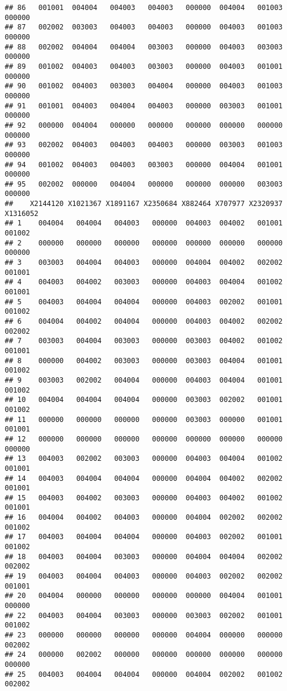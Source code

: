 \documentclass[
]{article}
\begin{document}
\begin{verbatim}
## 86   001001  004004   004003   004003   000000  004004   001003   000000
## 87   002002  003003   004003   004003   000000  004003   001003   000000
## 88   002002  004004   004004   003003   000000  004003   003003   000000
## 89   001002  004003   004003   003003   000000  004003   001001   000000
## 90   001002  004003   003003   004004   000000  004003   001003   000000
## 91   001001  004003   004004   004003   000000  003003   001001   000000
## 92   000000  004004   000000   000000   000000  000000   000000   000000
## 93   002002  004003   004003   004003   000000  003003   001003   000000
## 94   001002  004003   004003   003003   000000  004004   001001   000000
## 95   002002  000000   004004   000000   000000  000000   003003   000000
##    X2144120 X1021367 X1891167 X2350684 X882464 X707977 X2320937 X1316052
## 1    004004   004004   004003   000000  004003  004002   001001   001002
## 2    000000   000000   000000   000000  000000  000000   000000   000000
## 3    003003   004004   004003   000000  004004  004002   002002   001001
## 4    004003   004002   003003   000000  004003  004004   001002   001001
## 5    004003   004004   004004   000000  004003  002002   001001   001002
## 6    004004   004002   004004   000000  004003  004002   002002   002002
## 7    003003   004004   003003   000000  003003  004002   001002   001001
## 8    000000   004002   003003   000000  003003  004004   001001   001002
## 9    003003   002002   004004   000000  004003  004004   001001   001002
## 10   004004   004004   004004   000000  003003  002002   001001   001002
## 11   000000   000000   000000   000000  003003  000000   001001   001001
## 12   000000   000000   000000   000000  000000  000000   000000   000000
## 13   004003   002002   003003   000000  004003  004004   001002   001001
## 14   004003   004004   004004   000000  004004  004002   002002   001001
## 15   004003   004002   003003   000000  004003  004002   001002   001001
## 16   004004   004002   004003   000000  004004  002002   002002   001002
## 17   004003   004004   004004   000000  004003  002002   001001   001002
## 18   004003   004004   003003   000000  004004  004004   002002   002002
## 19   004003   004004   004003   000000  004003  002002   002002   001001
## 20   004004   000000   000000   000000  000000  004004   001001   000000
## 22   004003   004004   003003   000000  003003  002002   001001   001002
## 23   000000   000000   000000   000000  004004  000000   000000   002002
## 24   000000   002002   000000   000000  000000  000000   000000   000000
## 25   004003   004004   004004   000000  004004  002002   001002   002002

\end{verbatim}
\end{document}

